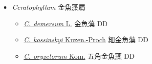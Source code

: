 
  \begin{itemize}
 \item[] \textit{Ceratophyllum} 金魚藻屬
                    
  \begin{itemize}
        \item[] \href{http://www.theplantlist.org/tpl1.1/search?q=Ceratophyllum+demersum}{\textit{C. demersum} L.}   金魚藻 DD
        \item[] \href{http://www.theplantlist.org/tpl1.1/search?q=Ceratophyllum+kossinskyi}{\textit{C. kossinskyi} Kuzen.-Proch}   細金魚藻 DD
        \item[] \href{http://www.theplantlist.org/tpl1.1/search?q=Ceratophyllum+oryzetorum}{\textit{C. oryzetorum} Kom.}   五角金魚藻 DD
  \end{itemize}
  \end{itemize}
